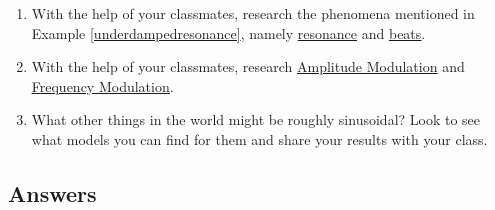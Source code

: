 \begin{enumerate}
\begin{enumerate}
\item Use the model you found in part \ref{MoonIllumination} to predict the fraction of the moon illuminated on June 1, 2009. \footnote{The listed fraction is $0.62$.}

\item Compare your results to those obtained using a graphing utility.

\end{enumerate}

\item  With the help of your classmates, research the phenomena mentioned in Example \ref{underdampedresonance}, namely \href{http://en.wikipedia.org/wiki/Resonance}{\underline{resonance}} and \href{http://en.wikipedia.org/wiki/Beat_(acoustics)}{\underline{beats}}.

\item  With the help of your classmates, research \href{http://en.wikipedia.org/wiki/Amplitude_modulation}{\underline{Amplitude Modulation}} and \href{http://en.wikipedia.org/wiki/Frequency_modulation}{\underline{Frequency Modulation}}.

\item What other things in the world might be roughly sinusoidal?  Look to see what models you can find for them and share your results with your class.

\end{enumerate}

\newpage

\subsection{Answers}

